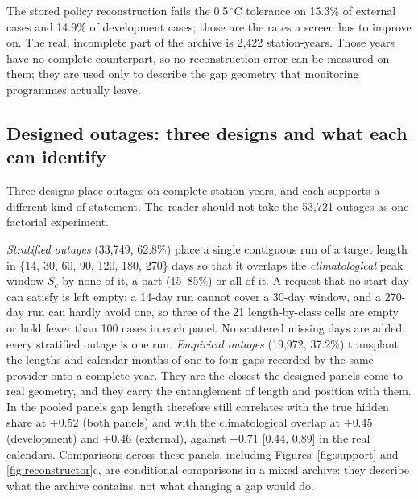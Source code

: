 \documentclass[draft]{agujournal2025}
\begin{document}
The stored policy reconstruction fails the 0.5\,$^{\circ}$C tolerance on 15.3\%
of external cases and 14.9\% of development cases; those are the rates a screen
has to improve on. The real, incomplete part of the archive is 2{,}422
station-years. Those years
have no complete counterpart, so no reconstruction error can be measured on
them; they are used only to describe the gap geometry that monitoring programmes
actually leave.

\subsection{Designed outages: three designs and what each can identify}

Three designs place outages on complete station-years, and each supports a
different kind of statement. The reader should not take the 53{,}721 outages as
one factorial experiment.

\emph{Stratified outages} (33{,}749, 62.8\%) place a single contiguous run of a
target length in \{14, 30, 60, 90, 120, 180, 270\} days so that it overlaps the
\emph{climatological} peak window $S_c$ by none of it, a part (15--85\%) or all
of it. A request that no start day can satisfy is left empty: a 14-day run cannot
cover a 30-day window, and a 270-day run can hardly avoid one, so three of the
21 length-by-class cells are empty or hold fewer than 100 cases in each panel.
No scattered missing days are added; every stratified outage is one run.
\emph{Empirical outages} (19{,}972, 37.2\%) transplant the lengths and calendar
months of one to four gaps recorded by the same provider onto a complete year.
They are the closest the designed panels come to real geometry, and they carry
the entanglement of length and position with them. In the pooled panels gap
length therefore still correlates with the true hidden share at $+0.52$ (both
panels) and with the climatological overlap at $+0.45$ (development) and $+0.46$
(external), against $+0.71$ [0.44, 0.89] in the real calendars. Comparisons
across these panels, including Figures~\ref{fig:support} and
\ref{fig:reconstructor}c, are conditional comparisons in a mixed archive: they
describe what the archive contains, not what changing a gap would do.
\end{document}
